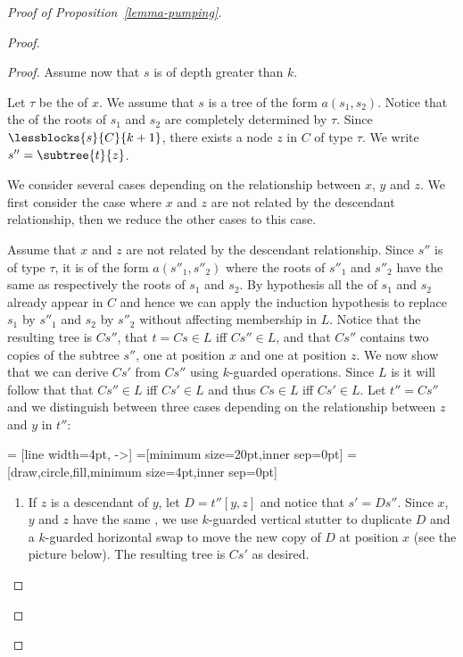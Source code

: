 \begin{proof}[Proof of Proposition~\ref{lemma-pumping}]
\begin{proof}
\begin{proof}
  Assume now that $s$ is of depth greater than $k$.
 
  Let $\tau$ be the  of $x$. We assume that $s$ is a tree of the form
  $a(s_1,s_2)$. Notice that the \ktype of the roots of $s_1$ and $s_2$ are completely determined
  by $\tau$. Since $\lessblocks{s}{C}{k+1}$, there exists a node $z$ in $C$ of
  type $\tau$. We write $s'' = \subtree{t}{z}$.

  We consider several cases depending on the relationship between $x$, $y$ and $z$.
  We first consider the case where $x$ and $z$ are not related by the descendant
  relationship, then we reduce the other cases to this case.

  Assume that $x$ and $z$ are not related by the descendant relationship. Since
  $s''$ is of type $\tau$, it is of the form $a(s''_1,s''_2)$ where the roots
  of $s''_1$ and $s''_2$ have the same \ktype as respectively the roots of
  $s_1$ and $s_2$. By hypothesis all the  of $s_1$ and $s_2$
  already appear in $C$ and hence we can apply the induction hypothesis to
  replace $s_1$ by $s''_1$ and $s_2$ by $s''_2$ without affecting membership
  in $L$. Notice that the resulting tree is $Cs''$, that $t=Cs \in L$ iff
  $Cs'' \in L$, and that $Cs''$ contains two copies of the subtree $s''$, one
  at position $x$ and one at position $z$. We now show that we can derive
  $Cs'$ from $Cs''$ using $k$-guarded operations. Since $L$ is \ktame it will
  follow that that $Cs'' \in L$ iff $Cs' \in L$ and thus $Cs \in L$ iff $Cs' \in L$.
  Let $t''=Cs''$ and we distinguish between three cases depending on the relationship between $z$ and $y$ in
  $t''$:


 = [line width=4pt, ->]
=[minimum size=20pt,inner sep=0pt]
=[draw,circle,fill,minimum size=4pt,inner sep=0pt]

\begin{enumerate}[(1)]
\item If $z$ is a descendant of $y$, let $D=t''[y,z]$ and notice that $s'=Ds''$. Since $x$, $y$ and $z$ have
  the same \ktype, we use $k$-guarded vertical stutter to duplicate $D$ and a
  $k$-guarded horizontal swap to move the new copy of $D$ at position $x$ (see
  the picture below). The resulting tree is $Cs'$ as desired.


\begin{center}
\end{center}
\end{enumerate}
\end{proof}
\end{proof}
\end{proof}
